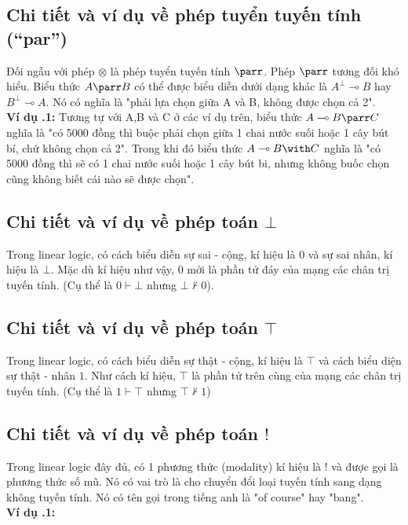 \documentclass[a4paper]{article}
\begin{document}
\subsection{Chi tiết và ví dụ về phép tuyển tuyến tính (“par”)}
Đối ngẫu với phép $\otimes$ là phép tuyển tuyến tính $\parr$. Phép $\parr$ tương đối khó hiểu. Biểu thức $A \parr B$ có thể được biểu diễn dưới dạng khác là $A^{\bot} \multimap B$ hay $B^{\bot} \multimap A$. Nó có nghĩa là "phải lựa chọn giữa A và B, không được chọn cả 2".\\

\textbf{Ví dụ \thesubsection.1:} Tương tự với A,B và C ở các ví dụ trên, biểu thức $A \multimap B \parr C$ nghĩa là "có 5000 đồng thì buộc phải chọn giữa 1 chai nước suối hoặc 1 cây bút bí, chứ không chọn cả 2". Trong khi đó biểu thức $A \multimap B \with C$ nghĩa là "có 5000 đồng thì sẽ có 1 chai nước suối hoặc 1 cây bút bi, nhưng không buốc chọn cũng không biết cái nào sẽ được chọn".

\subsection{Chi tiết và ví dụ về phép toán $\bot$}
Trong linear logic, có cách biểu diễn sự sai - cộng, kí hiệu là $0$ và sự sai nhân, kí hiệu là $\bot$. Mặc dù kí hiệu như vậy, $0$ mới là phần tử đáy của mạng các chân trị tuyến tính. (Cụ thể là $0 \vdash \bot$ nhưng $\bot \nvdash 0$).

\subsection{Chi tiết và ví dụ về phép toán $\top$}
Trong linear logic, có cách biểu diễn sự thật - cộng, kí hiệu là $\top$ và cách biểu diện sự thật - nhân $1$. Như cách kí hiệu, $\top$ là phần tử trên cùng của mạng các chân trị tuyến tính. (Cụ thể là $1 \vdash \top$ nhưng $\top \nvdash 1$)


\subsection{Chi tiết và ví dụ về phép toán $!$}
Trong linear logic đây đủ, có 1 phương thức (modality) kí hiệu là $!$ và được gọi là phương thức số mũ. Nó có vai trò là cho chuyển đổi loại tuyến tính sang dạng không tuyến tính. Nó có tên gọi trong tiếng anh là "of course" hay "bang".\\
\textbf{Ví dụ \thesubsection.1:}
\end{document}
